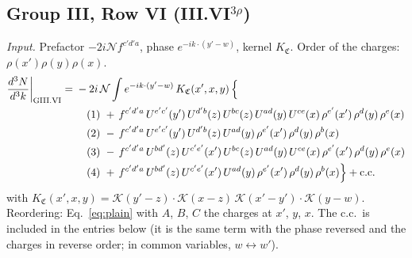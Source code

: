 \documentclass[10pt]{article}
\numberwithin{equation}{section}
\newcommand{\KK}{\mathcal K}
\newcommand{\NN}{\mathcal N}
\begin{document}
\subsection{Group III, Row VI \texorpdfstring{(III.VI$^{3\rho}$)}{}}\label{src:3:III.VI}
\emph{Input.} Prefactor $-2i\NN f^{c'd'a}$, phase $e^{-ik\cdot(y'-w)}$, kernel $K_{\mathfrak C}$. Order of the charges: $\rho(x')\rho(y)\rho(x)$.
\begin{align}
\frac{d^3N}{d^3k}\bigg|_{\rm GIII.VI}={}&-2i\,\NN\int e^{-ik\cdot(y'-w)}\,K_{\mathfrak C}(x',x,y)\,\Big\{\notag\\
&\quad (1)\ +\,f^{c'd'a}\,U^{e'c'}(y')\,U^{d'b}(z)\,U^{bc}(z)\,U^{ad}(y)\,U^{ce}(x)\,\rho^{e'}(x')\,\rho^{d}(y)\,\rho^{e}(x)\notag\\
&\quad (2)\ -\,f^{c'd'a}\,U^{e'c'}(y')\,U^{d'b}(z)\,U^{ad}(y)\,\rho^{e'}(x')\,\rho^{d}(y)\,\rho^{b}(x)\notag\\
&\quad (3)\ -\,f^{c'd'a}\,U^{bd'}(z)\,U^{c'e'}(x')\,U^{bc}(z)\,U^{ad}(y)\,U^{ce}(x)\,\rho^{e'}(x')\,\rho^{d}(y)\,\rho^{e}(x)\notag\\
&\quad (4)\ +\,f^{c'd'a}\,U^{bd'}(z)\,U^{c'e'}(x')\,U^{ad}(y)\,\rho^{e'}(x')\,\rho^{d}(y)\,\rho^{b}(x)\Big\}+{\rm c.c.}\label{eq:in-GIII.VI}
\end{align}
with $K_{\mathfrak C}(x',x,y)=\KK(y'-z)\cdot\KK(x-z)\,\KK(x'-y')\cdot\KK(y-w)$.
Reordering: Eq.~\eqref{eq:plain} with $A$, $B$, $C$ the charges at $x'$, $y$, $x$.
The c.c.\ is included in the entries below (it is the same term with the phase reversed and the charges in reverse order; in common variables, $w\leftrightarrow w'$).
\end{document}
